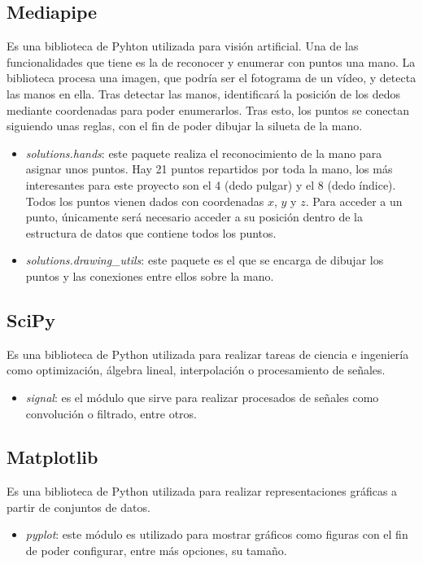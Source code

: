 \subsection{Mediapipe}\label{lib:mediapipe}
Es una biblioteca de Pyhton utilizada para visión artificial. Una de las funcionalidades que tiene es la de reconocer y enumerar con puntos una mano. La biblioteca procesa una imagen, que podría ser el fotograma de un vídeo, y detecta las manos en ella. Tras detectar las manos, identificará la posición de los dedos mediante coordenadas para poder enumerarlos. Tras esto, los puntos se conectan siguiendo unas reglas, con el fin de poder dibujar la silueta de la mano.
\begin{itemize}
	\item \textit{solutions.hands}: este paquete realiza el reconocimiento de la mano para asignar unos puntos. Hay 21 puntos repartidos por toda la mano, los más interesantes para este proyecto son el 4 (dedo pulgar) y el 8 (dedo índice). Todos los puntos vienen dados con coordenadas $x$, $y$ y $z$. Para acceder a un punto, únicamente será necesario acceder a su posición dentro de la estructura de datos que contiene todos los puntos. \cite{mediapipehands}
	\item \textit{solutions.drawing\_utils}: este paquete es el que se encarga de dibujar los puntos y las conexiones entre ellos sobre la mano.
\end{itemize}

\subsection{SciPy}
Es una biblioteca de Python utilizada para realizar tareas de ciencia e ingeniería como optimización, álgebra lineal, interpolación o procesamiento de señales.~\cite{wiki:scipy}
\begin{itemize}
	\item \textit{signal}: es el módulo que sirve para realizar procesados de señales como convolución o filtrado, entre otros.~\cite{scipysignal}
\end{itemize}

\subsection{Matplotlib}
Es una biblioteca de Python utilizada para realizar representaciones gráficas a partir de conjuntos de datos.
\begin{itemize}
	\item \textit{pyplot}: este módulo es utilizado para mostrar gráficos como figuras con el fin de poder configurar, entre más opciones, su tamaño. \cite{plt}
\end{itemize}

